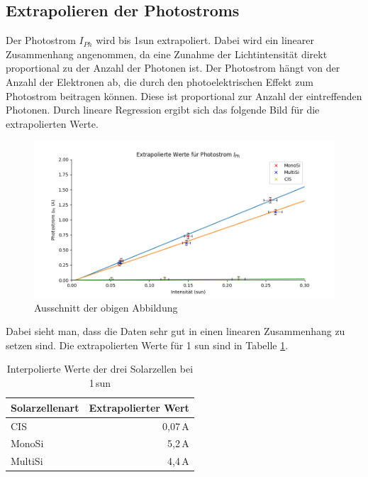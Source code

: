 \subsection{Extrapolieren der Photostroms}

Der Photostrom $I_{Ph}$ wird bis 1sun extrapoliert. Dabei wird ein linearer Zusammenhang angenommen, da eine Zunahme der Lichtintensität direkt proportional zu der 
Anzahl der Photonen ist. Der Photostrom hängt von der Anzahl der Elektronen ab, die durch den photoelektrischen Effekt zum Photostrom beitragen können. Diese ist proportional zur 
Anzahl der eintreffenden Photonen. Durch lineare Regression ergibt sich das folgende Bild für die extrapolierten Werte.
\begin{figure}[h]
    \centering
    \includegraphics[width = 12cm]{Bilder/ExtraInt.png}
    \caption{Ausschnitt der obigen Abbildung}
\end{figure} 

Dabei sieht man, dass die Daten sehr gut in einen linearen Zusammenhang zu setzen sind. Die extrapolierten Werte für 1 sun sind in Tabelle \ref{tabelle:Interpol}.
\begin{table}[hat]
    \centering
    \begin{tabular}{lr}
        Solarzellenart & Extrapolierter Wert\\
        \midrule
        CIS & 0,07\,A\\
        MonoSi&5,2\,A\\
        MultiSi&4,4\,A\\
    \end{tabular}
    \caption{Interpolierte Werte der drei Solarzellen bei 1\,sun}
    \label{tabelle:Interpol}
\end{table}
